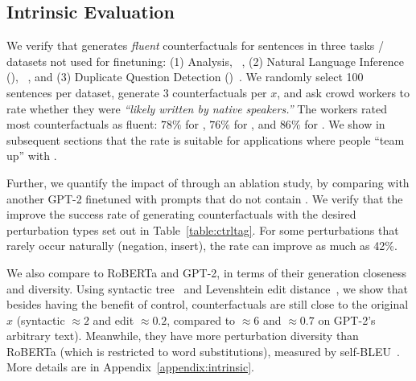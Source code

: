 \subsection{Intrinsic Evaluation}
\label{subsec:intrinsic}



We verify that \sysname generates \emph{fluent} counterfactuals for sentences in three tasks / datasets not used for finetuning: (1) \sst Analysis, \dsst~\cite{socher2013recursive},
(2) Natural Language Inference (\nli), \dnli~\cite{bowman-etal-2015-large}, and 
(3) Duplicate Question Detection (\dqqp)~\cite{wang2018glue}.
We randomly select 100 sentences per dataset, generate 3 \sysname counterfactuals per $x$, and ask crowd workers to rate whether they were \emph{``likely written by native speakers.''}
The workers rated most counterfactuals as fluent: $78\%$ for \dsst, $76\%$ for \dqqp, and $86\%$ for \dnli.
We show in subsequent sections that the rate is suitable for applications where people ``team up'' with \sysname.

Further, we quantify the impact of \tagstrs through an ablation study, \ie by comparing \sysname with another GPT-2 finetuned with prompts that do not contain \tagstrshorts.
We verify that the \tagstrshorts improve the success rate of generating counterfactuals with the desired perturbation types set out in Table~\ref{table:ctrltag}.
For some perturbations that rarely occur naturally (\eg negation, insert), the rate can improve as much as 42\%.

We also compare \sysname to RoBERTa and GPT-2, in terms of their generation closeness and diversity.
Using syntactic tree~\cite{zhang1989simple} and Levenshtein edit distance~\cite{levenshtein1966binary}, we show that besides having the benefit of control, \sysname counterfactuals are still close to the original $x$ (syntactic ${\approx}2$ and edit ${\approx}0.2$, compared to ${\approx}6$ and ${\approx}0.7$ on GPT-2's arbitrary text).
Meanwhile, they have more perturbation diversity than RoBERTa (which is restricted to word substitutions), measured by self-BLEU~\cite{zhu2018texygen}.
More details are in Appendix~\ref{appendix:intrinsic}.


